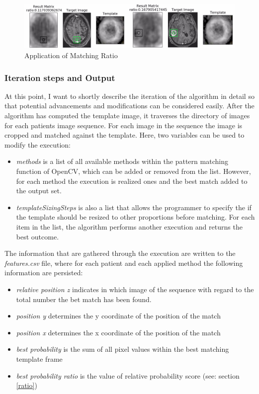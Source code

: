 \documentclass[twoside,11pt]{article}
\begin{document}
	\begin{figure}
		\label{fig:ratio}
		\centering
		\includegraphics[width=14cm]{ratio}
		\caption{Application of Matching Ratio}
	\end{figure}%
	
	\subsubsection{Iteration steps and Output}
	At this point, I want to shortly describe the iteration of the algorithm in detail so that potential advancements and modifications can be considered easily. After the algorithm has computed the template image, it traverses the directory of images for each patients image sequence. For each image in the sequence the image is cropped and matched against the template. Here, two variables can be used to modify the execution:
	\begin{itemize}
		\item \textit{methods} is a list of all available methods within the pattern matching function of OpenCV, which can be added or removed from the list. However, for each method the execution is realized ones and the best match added to the output set.
		\item \textit{templateSizingSteps} is also a list that allows the programmer to specify the if the template should be resized to other proportions before matching. For each item in the list, the algorithm performs another execution and returns the best outcome.
	\end{itemize}
	
	The information that are gathered through the execution are written to the \textit{features.csv} file, where for each patient and each applied method the following information are persisted:
	
	\begin{itemize}
		\item \textit{relative position z} indicates in which image of the sequence with regard to the total number the bet match has been found.
		\item \textit{position y} determines the y coordinate of the position of the match
		\item \textit{position x} determines the x coordinate of the position of the match
		\item \textit{best probability} is the sum of all pixel values within the best matching template frame
		\item \textit{best probability ratio} is the value of relative probability score (see: section \ref{ratio}) 
	\end{itemize}
	
\end{document}
